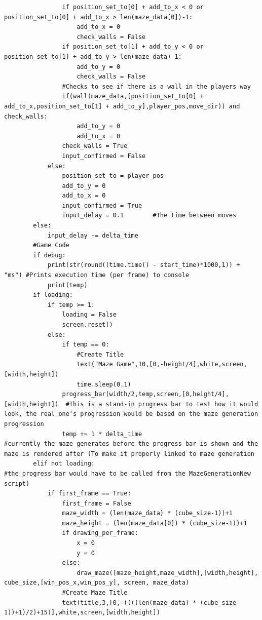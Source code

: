 \documentclass{article}
\begin{document}
\begin{lstlisting}
                if position_set_to[0] + add_to_x < 0 or position_set_to[0] + add_to_x > len(maze_data[0])-1:
                    add_to_x = 0
                    check_walls = False
                if position_set_to[1] + add_to_y < 0 or position_set_to[1] + add_to_y > len(maze_data)-1:
                    add_to_y = 0
                    check_walls = False
                #Checks to see if there is a wall in the players way
                if(wall(maze_data,[position_set_to[0] + add_to_x,position_set_to[1] + add_to_y],player_pos,move_dir)) and check_walls:
                    add_to_y = 0
                    add_to_x = 0
                check_walls = True
                input_confirmed = False
            else:
                position_set_to = player_pos
                add_to_y = 0
                add_to_x = 0
                input_confirmed = True
                input_delay = 0.1        #The time between moves
        else:
            input_delay -= delta_time
        #Game Code
        if debug:
            print(str(round((time.time() - start_time)*1000,1)) + "ms") #Prints execution time (per frame) to console
            print(temp)
        if loading:
            if temp >= 1:
                loading = False
                screen.reset()
            else:
                if temp == 0:
                    #Create Title
                    text("Maze Game",10,[0,-height/4],white,screen,[width,height])
                    time.sleep(0.1)
                progress_bar(width/2,temp,screen,[0,height/4],[width,height])  #This is a stand-in progress bar to test how it would look, the real one's progression would be based on the maze generation progression
                temp += 1 * delta_time                                  #currently the maze generates before the progress bar is shown and the maze is rendered after (To make it properly linked to maze generation
        elif not loading:                                               #the progress bar would have to be called from the MazeGenerationNew script)
            if first_frame == True:                
                first_frame = False            
                maze_width = (len(maze_data) * (cube_size-1))+1
                maze_height = (len(maze_data[0]) * (cube_size-1))+1
                if drawing_per_frame:
                    x = 0
                    y = 0
                else:
                    draw_maze([maze_height,maze_width],[width,height], cube_size,[win_pos_x,win_pos_y], screen, maze_data)
                #Create Maze Title
                text(title,3,[0,-((((len(maze_data) * (cube_size-1))+1)/2)+15)],white,screen,[width,height])

\end{lstlisting}
\end{document}
